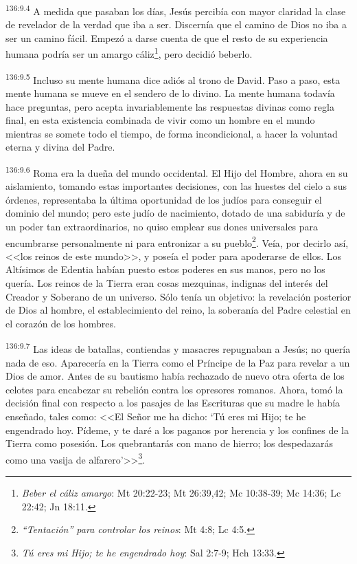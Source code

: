 \par 
\textsuperscript{136:9.4} A medida que pasaban los días, Jesús percibía con mayor claridad la clase de revelador de la verdad que iba a ser. Discernía que el camino de Dios no iba a ser un camino fácil. Empezó a darse cuenta de que el resto de su experiencia humana podría ser un amargo cáliz\footnote{\textit{Beber el cáliz amargo}: Mt 20:22-23; Mt 26:39,42; Mc 10:38-39; Mc 14:36; Lc 22:42; Jn 18:11.}, pero decidió beberlo.

\par 
\textsuperscript{136:9.5} Incluso su mente humana dice adiós al trono de David. Paso a paso, esta mente humana se mueve en el sendero de lo divino. La mente humana todavía hace preguntas, pero acepta invariablemente las respuestas divinas como regla final, en esta existencia combinada de vivir como un hombre en el mundo mientras se somete todo el tiempo, de forma incondicional, a hacer la voluntad eterna y divina del Padre.

\par 
\textsuperscript{136:9.6} Roma era la dueña del mundo occidental. El Hijo del Hombre, ahora en su aislamiento, tomando estas importantes decisiones, con las huestes del cielo a sus órdenes, representaba la última oportunidad de los judíos para conseguir el dominio del mundo; pero este judío de nacimiento, dotado de una sabiduría y de un poder tan extraordinarios, no quiso emplear sus dones universales para encumbrarse personalmente ni para entronizar a su pueblo\footnote{\textit{``Tentación'' para controlar los reinos}: Mt 4:8; Lc 4:5.}. Veía, por decirlo así, <<los reinos de este mundo>>, y poseía el poder para apoderarse de ellos. Los Altísimos de Edentia habían puesto estos poderes en sus manos, pero no los quería. Los reinos de la Tierra eran cosas mezquinas, indignas del interés del Creador y Soberano de un universo. Sólo tenía un objetivo: la revelación posterior de Dios al hombre, el establecimiento del reino, la soberanía del Padre celestial en el corazón de los hombres.

\par 
\textsuperscript{136:9.7} Las ideas de batallas, contiendas y masacres repugnaban a Jesús; no quería nada de eso. Aparecería en la Tierra como el Príncipe de la Paz para revelar a un Dios de amor. Antes de su bautismo había rechazado de nuevo otra oferta de los celotes para encabezar su rebelión contra los opresores romanos. Ahora, tomó la decisión final con respecto a los pasajes de las Escrituras que su madre le había enseñado, tales como: <<El Señor me ha dicho: `Tú eres mi Hijo; te he engendrado hoy. Pídeme, y te daré a los paganos por herencia y los confines de la Tierra como posesión. Los quebrantarás con mano de hierro; los despedazarás como una vasija de alfarero'>>\footnote{\textit{Tú eres mi Hijo; te he engendrado hoy}: Sal 2:7-9; Hch 13:33.}.

